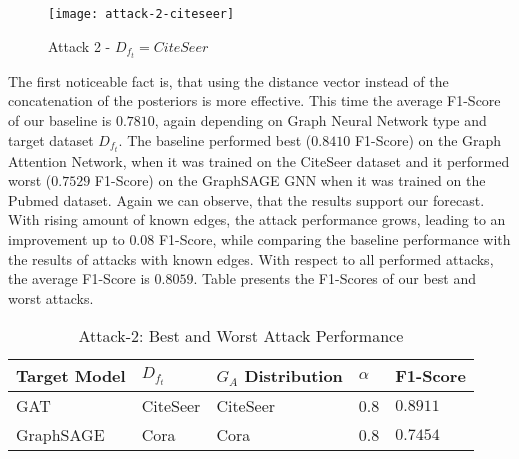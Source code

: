             \begin{figure}[h]
                \begin{center}
                    \texttt{[image: attack-2-citeseer]}
                    \caption{Attack 2 - $D_{f_t} = CiteSeer$}
                    \label{figure:eval-att2-citeseer}
                \end{center}
            \end{figure}

            The first noticeable fact is, that using the distance vector instead of the concatenation of the posteriors is more effective.
            This time the average F1-Score of our baseline is $0.7810$, again depending on Graph Neural Network type and target dataset $D_{f_t}$.
            The baseline performed best ($0.8410$ F1-Score) on the Graph Attention Network, when it was trained on the  CiteSeer dataset and it performed worst ($0.7529$ F1-Score) on the GraphSAGE GNN when it was trained on the Pubmed dataset.
            Again we can observe, that the results support our forecast.
            With rising amount of known edges, the attack performance grows, leading to an improvement up to $0.08$ F1-Score, while comparing the baseline performance with the results of attacks with known edges.
            With respect to all performed attacks, the average F1-Score is $0.8059$.
            Table  presents the F1-Scores of our best and worst attacks.
            
            \vspace{0.48cm}
            \begin{table}[!h]
                \centering
                \footnotesize
                \begin{tabular}{l|l|l|l|l|}
                \toprule
                Target Model & $D_{f_t}$ & $G_A$ Distribution & $\alpha$ & F1-Score \\
                \midrule
                GAT       & CiteSeer & CiteSeer & 0.8 & $0.8911$ \\
                GraphSAGE & Cora     & Cora     & 0.8 & $0.7454$ \\
                
                \bottomrule
                \end{tabular}
                \caption{Attack-2: Best and Worst Attack Performance}
                \label{table:attack2-best-and-worst-performance}
            \end{table}

